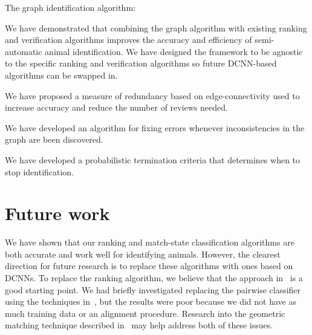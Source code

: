 \begin{enumln}
    \item {The graph identification algorithm}:
        \begin{enumln}

        \item 
            We have demonstrated that combining the graph algorithm with existing ranking and verification
              algorithms improves the accuracy and efficiency of semi-automatic animal identification.
            We have designed the framework to be agnostic to the specific ranking and verification algorithms so
              future DCNN-based algorithms can be swapped in.

        \item We have proposed a measure of redundancy based on edge-connectivity used to increase accuracy and
          reduce the number of reviews needed.

        \item We have developed an algorithm for fixing errors whenever inconsistencies in the graph are been
          discovered.

        \item We have developed a probabilistic termination criteria that determines when to stop identification.
        \end{enumln}
    \end{enumln}

    \section{Future work}\label{sec:futurework}

    We have shown that our ranking and match-state classification algorithms are both accurate and work well for
      identifying animals.
    However, the clearest direction for future research is to replace these algorithms with ones based on DCNNs.
    To replace the ranking algorithm, we believe that the approach in~\cite{arandjelovic_netvlad_2016} is a good
      starting point.
    We had briefly investigated replacing the pairwise classifier using the techniques
      in~\cite{taigman_deepface_2014}, but the results were poor because we did not have as much training data or
      an alignment procedure.
    Research into the geometric matching technique described in~\cite{rocco_convolutional_2017} may help address
      both of these issues.

